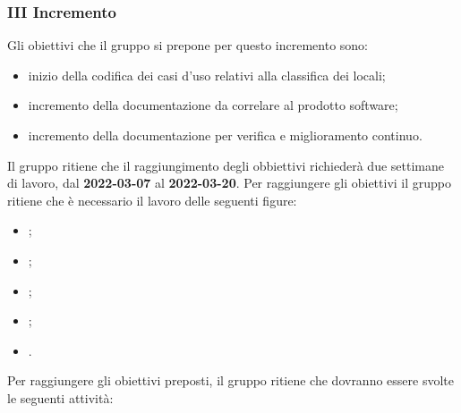 \subsubsection{III Incremento}
Gli obiettivi che il gruppo si prepone per questo incremento sono:
\begin{itemize}
	\item inizio della codifica dei casi d'uso relativi alla classifica dei locali;
 	\item incremento della documentazione da correlare al prodotto software;
	\item incremento della documentazione per verifica e miglioramento continuo.
\end{itemize}
Il gruppo ritiene che il raggiungimento degli obbiettivi richiederà due settimane di lavoro, dal \textbf{2022-03-07} al \textbf{2022-03-20}.
Per raggiungere gli obiettivi il gruppo ritiene che è necessario il lavoro delle seguenti figure:
\begin{itemize}
	\item \RE{};
 	\item \AM{};
   	\item \PT{};
    \item \PR{};
   	\item \VE{}.
\end{itemize}
Per raggiungere gli obiettivi preposti, il gruppo ritiene che dovranno essere svolte le seguenti attività:
